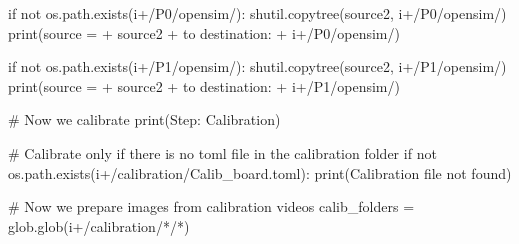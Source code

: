 \documentclass[
  letterpaper,
  DIV=11,
  numbers=noendperiod]{scrreprt}
\newenvironment{Shaded}{\begin{snugshade}}{\end{snugshade}}
\newcommand{\BuiltInTok}[1]{\textcolor[rgb]{0.00,0.23,0.31}{#1}}
\newcommand{\CommentTok}[1]{\textcolor[rgb]{0.37,0.37,0.37}{#1}}
\newcommand{\ControlFlowTok}[1]{\textcolor[rgb]{0.00,0.23,0.31}{#1}}
\newcommand{\KeywordTok}[1]{\textcolor[rgb]{0.00,0.23,0.31}{#1}}
\newcommand{\NormalTok}[1]{\textcolor[rgb]{0.00,0.23,0.31}{#1}}
\newcommand{\OperatorTok}[1]{\textcolor[rgb]{0.37,0.37,0.37}{#1}}
\newcommand{\StringTok}[1]{\textcolor[rgb]{0.13,0.47,0.30}{#1}}
\begin{document}
\begin{Shaded}
\begin{Highlighting}[]
    \ControlFlowTok{if} \KeywordTok{not}\NormalTok{ os.path.exists(i}\OperatorTok{+}\StringTok{\textquotesingle{}/P0/opensim/\textquotesingle{}}\NormalTok{):}
\NormalTok{        shutil.copytree(source2, i}\OperatorTok{+}\StringTok{\textquotesingle{}/P0/opensim/\textquotesingle{}}\NormalTok{)}
        \BuiltInTok{print}\NormalTok{(}\StringTok{\textquotesingle{}source = \textquotesingle{}} \OperatorTok{+}\NormalTok{ source2 }\OperatorTok{+} \StringTok{\textquotesingle{} to destination: \textquotesingle{}} \OperatorTok{+}\NormalTok{ i}\OperatorTok{+}\StringTok{\textquotesingle{}/P0/opensim/\textquotesingle{}}\NormalTok{)}

    \ControlFlowTok{if} \KeywordTok{not}\NormalTok{ os.path.exists(i}\OperatorTok{+}\StringTok{\textquotesingle{}/P1/opensim/\textquotesingle{}}\NormalTok{):}
\NormalTok{        shutil.copytree(source2, i}\OperatorTok{+}\StringTok{\textquotesingle{}/P1/opensim/\textquotesingle{}}\NormalTok{)}
        \BuiltInTok{print}\NormalTok{(}\StringTok{\textquotesingle{}source = \textquotesingle{}} \OperatorTok{+}\NormalTok{ source2 }\OperatorTok{+} \StringTok{\textquotesingle{} to destination: \textquotesingle{}} \OperatorTok{+}\NormalTok{ i}\OperatorTok{+}\StringTok{\textquotesingle{}/P1/opensim/\textquotesingle{}}\NormalTok{)}

    \CommentTok{\# Now we calibrate}
    \BuiltInTok{print}\NormalTok{(}\StringTok{\textquotesingle{}Step: Calibration\textquotesingle{}}\NormalTok{)}

    \CommentTok{\# Calibrate only if there is no toml file in the calibration folder}
    \ControlFlowTok{if} \KeywordTok{not}\NormalTok{ os.path.exists(i}\OperatorTok{+}\StringTok{\textquotesingle{}/calibration/Calib\_board.toml\textquotesingle{}}\NormalTok{):}
        \BuiltInTok{print}\NormalTok{(}\StringTok{\textquotesingle{}Calibration file not found\textquotesingle{}}\NormalTok{)}
        
        \CommentTok{\# Now we prepare images from calibration videos}
\NormalTok{        calib\_folders }\OperatorTok{=}\NormalTok{ glob.glob(i}\OperatorTok{+}\StringTok{\textquotesingle{}/calibration/*/*\textquotesingle{}}\NormalTok{)}


\end{Highlighting}
\end{Shaded}
\end{document}
